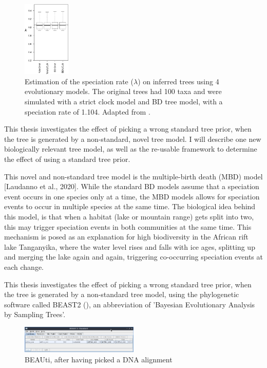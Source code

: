 \begin{figure}[H]
  \includegraphics[width=0.2\textwidth]{sarver2019choice_top_4_bars.png}
  \caption{
    Estimation of the speciation rate ($\lambda$)
    on inferred trees using 4 evolutionary models.
    The original trees had 100 taxa and were simulated with a strict clock model 
    and BD tree model, with a speciation rate of 1.104.
    Adapted from \cite{sarver2019choice}.
 }
  \label{fig:sarver2019choice}
\end{figure}

This thesis investigates the effect of picking a wrong standard
tree prior, when the tree is generated by a non-standard, novel tree model.
I will describe one new biologically relevant tree model, as well as the re-usable framework to determine the effect of using a standard tree prior. 

This novel and non-standard tree model is the multiple-birth 
death (MBD) model [Laudanno et al., 2020].
While the standard BD models assume that a speciation event occurs in one
species only at a time, the MBD models allows for speciation events
to occur in multiple species at the same time.
The biological idea behind this model, is that when a 
habitat (lake or mountain range) gets split into two, 
this may trigger speciation events in both communities at the same time. 
This mechanism is posed as an
explanation for high biodiversity in the African rift lake Tanganyika,
where the water level rises and falls with ice ages,
splitting up and merging the lake again and again, 
triggering co-occurring speciation events at each change. 

%
%
%

This thesis investigates the effect of picking a wrong standard
tree prior, when the tree is generated 
by a non-standard tree model, using the phylogenetic software 
called BEAST2 (\cite{beast2}),
an abbreviation of 'Bayesian Evolutionary Analysis by Sampling Trees'.

\begin{figure}[H]
  \includegraphics[width=0.5\textwidth]{beauti_alignment.png}
  \caption{
    BEAUti, after having picked a DNA alignment
  }
  \label{fig:beauti_alignment}
\end{figure}

